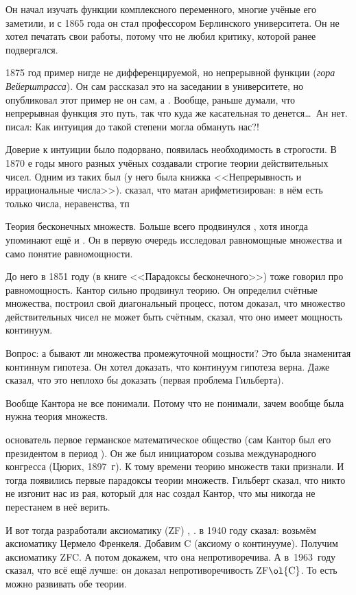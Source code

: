 \documentclass[a4paper,oneside,fleqn,10pt]{article}
\begin{document}
Он начал изучать функции комплексного переменного, многие учёные его
заметили, и с 1865 года он стал профессором Берлинского
университета. Он не хотел печатать свои работы, потому что не любил
критику, которой ранее подвергался.

1875 год пример нигде не дифференцируемой, но непрерывной функции
(\emph{гора Вейерштрасса}).  Он сам рассказал это на заседании в
университете, но опубликовал этот пример не он сам, а
.  Вообще, раньше думали, что непрерывная функция
это путь, так что куда же касательная то денется\ldots\ Ан
нет.  писал: Как интуиция до такой степени могла
обмануть нас?!

Доверие к интуиции было подорвано, появилась необходимость в
строгости.  В 1870 е годы много разных учёных создавали строгие теории
действительных чисел.  Одним из таких был  (у него была
книжка <<Непрерывность и иррациональные числа>>).  
сказал, что матан арифметизирован: в нём есть только числа,
неравенства, тп

Теория бесконечных множеств. Больше всего продвинулся , хотя иногда упоминают ещё и
. Он в первую очередь исследовал
равномощные множества и само понятие равномощности.

До него в 1851 году  (в книге <<Парадоксы
бесконечного>>) тоже говорил про равномощность.  Кантор сильно
продвинул теорию. Он определил счётные множества, построил свой
диагональный процесс, потом доказал, что множество действительных
чисел не может быть счётным, сказал, что оно имеет мощность континуум.

Вопрос: а бывают ли множества промежуточной мощности? Это была
знаменитая континнум гипотеза.  Он хотел доказать, что континуум
гипотеза верна. Даже  сказал, что это неплохо бы
доказать (первая проблема Гильберта).

Вообще Кантора не все понимали. Потому что не понимали, зачем вообще
была нужна теория множеств.

 основатель первое германское математическое общество
(сам Кантор был его президентом в период ).  Он же был
инициатором созыва международного конгресса (Цюрих, 1897~г).  К тому
времени теорию множеств таки признали. И тогда появились первые
парадоксы теории множеств. Гильберт сказал, что никто не изгонит нас
из рая, который для нас создал Кантор, что мы никогда не перестанем в
неё верить.

И вот тогда разработали аксиоматику (ZF) ,
.   в 1940 году сказал: возьмём
аксиоматику Цермело Френкеля.  Добавим C (аксиому о
континууме). Получим аксиоматику ZFC.  А потом докажем, что она
непротиворечива.  А в~1963~году  сказал, что всё ещё лучше:
он доказал непротиворечивость ZF$\ol{\rm C}$.  То есть можно развивать
обе теории.
\end{document}
